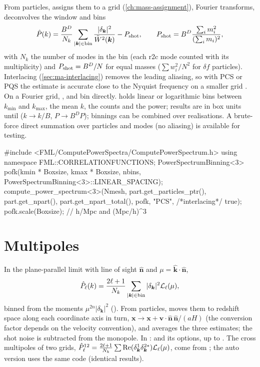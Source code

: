 From particles,  assigns them to a grid (\cref{ch:mass-assignment}), Fourier transforms, deconvolves the
window and bins
\begin{equation}
\hat P(k)=\frac{B^D}{N_k}\sum_{|\bm k|\in{\rm bin}}\frac{|\delta_{\bm k}|^2}{\tilde W^2(\bm k)}-P_{\rm shot},\qquad
P_{\rm shot}=B^D\frac{\sum_im_i^2}{(\sum_im_i)^2},
\end{equation}
with $N_k$ the number of modes in the bin (each r2c mode counted with its multiplicity) and $P_{\rm shot}=B^D/N$ for equal masses ($\sum w_i^2/N^2$ for
$\delta f$ particles). Interlacing (\cref{sec:ma-interlacing}) removes the leading aliasing, so with PCS or PQS the estimate is accurate close to the
Nyquist frequency on a smaller grid \cite{Sefusatti2016}. On a Fourier grid, ,  and
 bin directly.  holds linear or logarithmic bins between $k_{\min}$ and $k_{\max}$,
the mean $k$, the counts and the power; results are in box units until  ($k\to k/B$, $P\to B^DP$); binnings can be combined
over realisations. A brute-force direct summation over particles and modes (no aliasing) is available for testing.

\begin{cppcode}[P(k) of particles]
#include <FML/ComputePowerSpectra/ComputePowerSpectrum.h>
using namespace FML::CORRELATIONFUNCTIONS;
PowerSpectrumBinning<3> pofk(kmin * Boxsize, kmax * Boxsize, nbins, PowerSpectrumBinning<3>::LINEAR_SPACING);
compute_power_spectrum<3>(Nmesh, part.get_particles_ptr(), part.get_npart(), part.get_npart_total(),
                          pofk, "PCS", /*interlacing*/ true);
pofk.scale(Boxsize);                         // h/Mpc and (Mpc/h)^3
\end{cppcode}

\section{Multipoles}\label{sec:pk-multipoles}

In the plane-parallel limit with line of sight $\hat{\bm n}$ and $\mu=\hat{\bm k}\cdot\hat{\bm n}$,
\begin{equation}
\hat P_\ell(k)=\frac{2\ell+1}{N_k}\sum_{|\bm k|\in{\rm bin}}|\delta_{\bm k}|^2\mathcal L_\ell(\mu),
\end{equation}
binned from the moments $\mu^{2n}|\delta_{\bm k}|^2$ (). From particles,
 moves them to redshift space along each coordinate axis in turn,
$\bm x\to\bm x+\bm v\cdot\hat{\bm n}\,\hat{\bm n}/(aH)$ (the conversion factor depends on the velocity convention), and averages the three
estimates; the shot noise is subtracted from the monopole. In :  and its options, up to
. The cross multipoles of two grids, $\hat P^{12}_\ell=\frac{2\ell+1}{N_k}\sum{\rm Re}(\delta^1_{\bm k}\delta^{2*}_{\bm k})\mathcal L_\ell(\mu)$,
come from ; the auto version uses the same code
(identical results).

